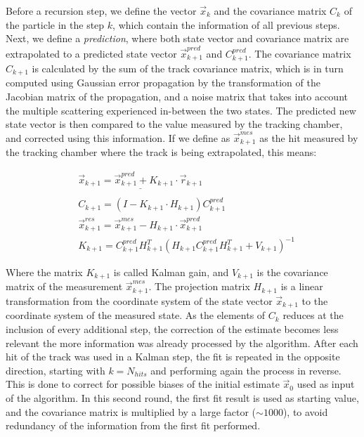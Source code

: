 Before a recursion step, we define the vector $\vec{x}_k$ and the covariance matrix $C_k$ of the particle in the step $k$, which contain the information of all previous steps. Next, we define a \textit{prediction}, where both state vector and covariance matrix are extrapolated to a predicted state vector $\vec{x}_{k+1}^{pred}$ and $C_{k+1}^{pred}$. The covariance matrix $C_{k+1}$ is calculated by the sum of the track covariance matrix, which is in turn computed using Gaussian error propagation by the transformation of the Jacobian matrix of the propagation, and a noise matrix that takes into account the multiple scattering experienced in-between the two states. The predicted new state vector is then compared to the value measured by the tracking chamber, and corrected using this information. If we define as $\vec{x}_{k+1}^{mes}$ as the hit measured by the tracking chamber where the track is being extrapolated, this means:

\begin{equation}
  \label{eq:kf-updates}
  \begin{aligned}  
    &\underline{\vec{x}_{k+1} = \vec{x}_{k+1}^{pred} + K_{k+1} \cdot \vec{r}_{k+1}} \\
    & \\
    &C_{k+1} = ( I - K_{k+1} \cdot H_{k+1} )C^{pred}_{k+1} \\
    &\vec{x}^{res}_{k+1} = \vec{x}_{k+1}^{mes} - H_{k+1} \cdot \vec{x}_{k+1}^{pred} \\
    &K_{k+1} = C^{pred}_{k+1} H^T_{k+1}(H_{k+1}C_{k+1}^{pred}H^T_{k+1} + V_{k+1})^{-1}    
  \end{aligned}
\end{equation}

Where the matrix $K_{k+1}$ is called Kalman gain, and $V_{k+1}$ is the covariance matrix of the measurement $\vec{x}_{k+1}^{mes}$. The projection matrix $H_{k+1}$ is a linear transformation from the coordinate system of the state vector $\vec{x}_{k+1}$ to the coordinate system of the measured state. As the elements of $C_k$ reduces at the inclusion of every additional step, the correction of the estimate becomes less relevant the more information was already processed by the algorithm. After each hit of the track was used in a Kalman step, the fit is repeated in the opposite direction, starting with $k = N_{hits}$ and performing again the process in reverse. This is done to correct for possible biases of the initial estimate $\vec{x}_0$ used as input of the algorithm. In this second round, the first fit result is used as starting value, and the covariance matrix is multiplied by a large factor ($\sim 1000$), to avoid redundancy of the information from the first fit performed.

